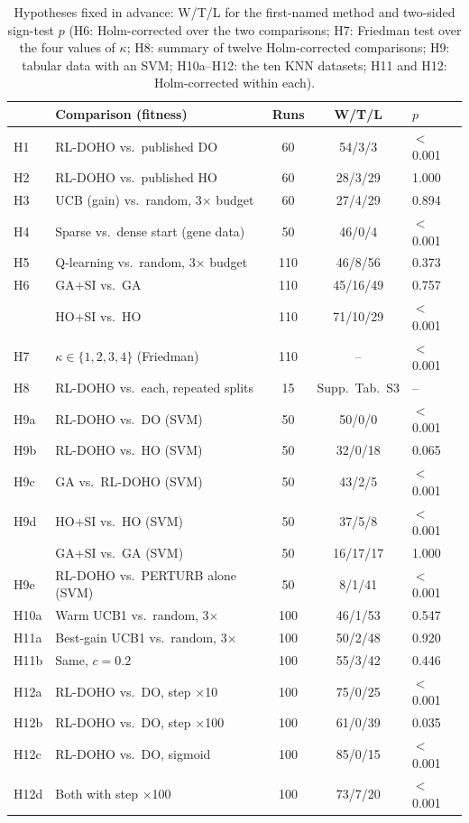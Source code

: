 \documentclass[journal]{IEEEtran}
\begin{document}
\begin{table}[t]
\centering
\caption{Hypotheses fixed in advance: W/T/L for the first-named method and two-sided sign-test $p$ (H6: Holm-corrected over the two comparisons; H7: Friedman test over the four values of $\kappa$; H8: summary of twelve Holm-corrected comparisons; H9: tabular data with an SVM; H10a--H12: the ten KNN datasets; H11 and H12: Holm-corrected within each).}
\label{tab:hyp}
\footnotesize
\setlength{\tabcolsep}{1.7pt}
\begin{tabular}{@{}llccl@{}}
\toprule
& Comparison (fitness) & Runs & W/T/L & $p$ \\
\midrule
H1 & RL-DOHO vs.\ published DO & 60 & 54/3/3 & $<$0.001 \\
H2 & RL-DOHO vs.\ published HO & 60 & 28/3/29 & 1.000 \\
H3 & UCB (gain) vs.\ random, 3$\times$ budget & 60 & 27/4/29 & 0.894 \\
H4 & Sparse vs.\ dense start (gene data) & 50 & 46/0/4 & $<$0.001 \\
\midrule
H5 & Q-learning vs.\ random, 3$\times$ budget & 110 & 46/8/56 & 0.373 \\
H6 & GA+SI vs.\ GA & 110 & 45/16/49 & 0.757 \\
   & HO+SI vs.\ HO & 110 & 71/10/29 & $<$0.001 \\
H7 & $\kappa\in\{1,2,3,4\}$ (Friedman) & 110 & -- & $<$0.001 \\
H8 & RL-DOHO vs.\ each, repeated splits & 15 & Supp.\ Tab.~S3 & -- \\
\midrule
H9a & RL-DOHO vs.\ DO (SVM) & 50 & 50/0/0 & $<$0.001 \\
H9b & RL-DOHO vs.\ HO (SVM) & 50 & 32/0/18 & 0.065 \\
H9c & GA vs.\ RL-DOHO (SVM) & 50 & 43/2/5 & $<$0.001 \\
H9d & HO+SI vs.\ HO (SVM) & 50 & 37/5/8 & $<$0.001 \\
 & GA+SI vs.\ GA (SVM) & 50 & 16/17/17 & 1.000 \\
H9e & RL-DOHO vs.\ PERTURB alone (SVM) & 50 & 8/1/41 & $<$0.001 \\
\midrule
H10a & Warm UCB1 vs.\ random, 3$\times$ & 100 & 46/1/53 & 0.547 \\
H11a & Best-gain UCB1 vs.\ random, 3$\times$ & 100 & 50/2/48 & 0.920 \\
H11b & Same, $c=0.2$ & 100 & 55/3/42 & 0.446 \\
\midrule
H12a & RL-DOHO vs.\ DO, step $\times$10 & 100 & 75/0/25 & $<$0.001 \\
H12b & RL-DOHO vs.\ DO, step $\times$100 & 100 & 61/0/39 & 0.035 \\
H12c & RL-DOHO vs.\ DO, sigmoid & 100 & 85/0/15 & $<$0.001 \\
H12d & Both with step $\times$100 & 100 & 73/7/20 & $<$0.001 \\
\bottomrule
\end{tabular}
\end{table}
\end{document}
